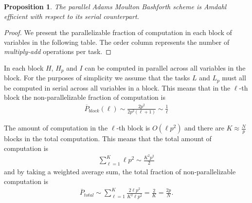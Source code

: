 \documentclass[pdf]{beamer}
\newtheorem{proposition}{Proposition}
\begin{document}
\begin{frame}
\begin{proposition}
The parallel Adams Moulton Bashforth scheme is Amdahl efficient with respect to its serial counterpart.
\end{proposition}
\begin{proof}
We present the parallelizable fraction of computation in each block of variables in the following table. The order column represents the number of \emph{multiply-add} operations per task.
\end{proof}
\end{frame}
\begin{frame}
In each block $ H $, $ H_p $ and $ I $ can be computed in parallel across all variables in the block. For the purposes of simplicity we assume that the tasks $ L $ and $ L_p $ must all be computed in serial across all variables in a block. This means that in the $ \ell$-th block the non-parallelizable fraction of computation is
\begin{align*}
    \overline{P}_{block}(\ell) \sim \frac{2p^2}{2p^2(\ell + 1) } \sim \frac{1}{\ell}
\end{align*}

The amount of computation in the $ \ell$-th block is $ O(\ell p^2) $ and there are $ K \approx \frac{N}{p} $ blocks in the total computation. This means that the total amount of computation is
\begin{align*}
    \sum_{\ell=1}^{K} \ell p^2 \sim \frac{K^2p^2}{2}
\end{align*}
and by taking a weighted average sum, the total fraction of non-parallelizable computation is
\begin{align*}
    \label{eq:tot_par_c}
    \overline{P}_{total} \sim \sum_{\ell = 1}^{K} \frac{2\ell p^2}{K^2 \ell p^2} = \frac{2}{K} = \frac{2p}{N}.
\end{align*}
\end{frame}
\end{document}
